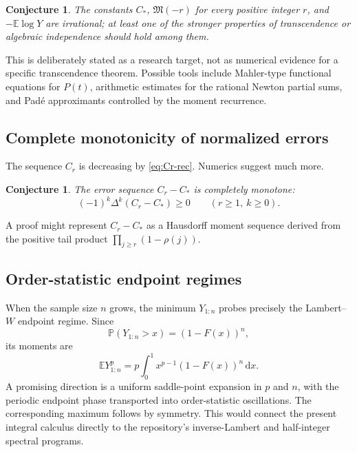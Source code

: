 \documentclass[11pt,oneside]{article}
\newtheorem{conjecture}[theorem]{Conjecture}
\theoremstyle{definition}
\newcommand{\F}{F}
\newcommand{\M}{\mathfrak M}
\newcommand{\E}{\mathbb E}
\newcommand{\Prob}{\mathbb P}
\newcommand{\dd}{\,\mathrm d}
\begin{document}
\begin{conjecture}\label{conj:irrationality}
The constants \(C_*\), \(\M(-r)\) for every positive integer \(r\), and
\(-\E\log Y\) are irrational; at least one of the stronger properties of
transcendence or algebraic independence should hold among them.
\end{conjecture}

This is deliberately stated as a research target, not as numerical evidence for a
specific transcendence theorem.  Possible tools include Mahler-type functional
equations for \(P(t)\), arithmetic estimates for the rational Newton partial sums, and
Pad\'e approximants controlled by the moment recurrence.

\subsection{Complete monotonicity of normalized errors}

The sequence \(C_r\) is decreasing by \cref{eq:Cr-rec}.  Numerics suggest much more.

\begin{conjecture}\label{conj:complete-monotone}
The error sequence \(C_r-C_*\) is completely monotone:
\begin{equation}\label{eq:complete-monotone-conj}
 (-1)^k\Delta^k(C_r-C_*)\ge0
 \qquad(r\ge1,\ k\ge0).
\end{equation}
\end{conjecture}

A proof might represent \(C_r-C_*\) as a Hausdorff moment sequence derived from the
positive tail product \(\prod_{j\ge r}(1-\rho(j))\).

\subsection{Order-statistic endpoint regimes}

When the sample size \(n\) grows, the minimum \(Y_{1:n}\) probes precisely the
Lambert--\(W\) endpoint regime.  Since
\[
 \Prob(Y_{1:n}>x)=(1-\F(x))^n,
\]
its moments are
\begin{equation}\label{eq:min-order-moment}
 \E Y_{1:n}^p=p\int_0^1x^{p-1}(1-\F(x))^n\dd x.
\end{equation}
A promising direction is a uniform saddle-point expansion in \(p\) and \(n\), with the
periodic endpoint phase transported into order-statistic oscillations.  The corresponding
maximum follows by symmetry.  This would connect the present integral calculus directly
to the repository's inverse-Lambert and half-integer spectral programs.
\end{document}
